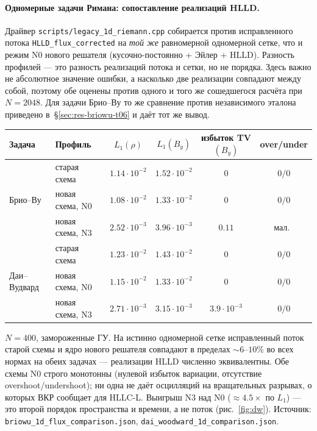 \documentclass[12pt,a4paper]{article}
\newcommand{\code}[1]{\texttt{#1}}
\begin{document}
\paragraph{Одномерные задачи Римана: сопоставление реализаций HLLD.}
Драйвер \code{scripts/legacy\_1d\_riemann.cpp} собирается против исправленного
потока \code{HLLD\_flux\_corrected} на \emph{той же} равномерной одномерной
сетке, что и режим N0 нового решателя (кусочно-постоянно + Эйлер + HLLD).
Разность профилей --- это разность реализаций потока и сетки, но не порядка.
Здесь важно не абсолютное значение ошибки, а насколько две реализации совпадают
между собой, поэтому обе оценены против одного и того же сошедшегося расчёта при
$N=2048$. Для задачи Брио--Ву то же сравнение против независимого эталона
приведено в~\S\ref{sec:res-briowu-t06} и даёт тот же вывод.

\begin{center}\footnotesize\setlength{\tabcolsep}{4.5pt}
\begin{tabular}{llcccc}
\toprule
Задача & Профиль & $L_1(\rho)$ & $L_1(B_y)$ & избыток TV$(B_y)$ & over/under \\
\midrule
\multirow{3}{*}{Брио--Ву}
 & старая схема & $1.14\!\cdot\!10^{-2}$ & $1.52\!\cdot\!10^{-2}$ & $0$ & $0/0$ \\
 & новая схема, N0 & $1.08\!\cdot\!10^{-2}$ & $1.33\!\cdot\!10^{-2}$ & $0$ & $0/0$ \\
 & новая схема, N3 & $2.52\!\cdot\!10^{-3}$ & $3.96\!\cdot\!10^{-3}$ & $0.11$ & мал.\ \\
\midrule
\multirow{3}{*}{Даи--Вудвард}
 & старая схема & $1.23\!\cdot\!10^{-2}$ & $1.43\!\cdot\!10^{-2}$ & $0$ & $0/0$ \\
 & новая схема, N0 & $1.15\!\cdot\!10^{-2}$ & $1.33\!\cdot\!10^{-2}$ & $0$ & $0/0$ \\
 & новая схема, N3 & $2.71\!\cdot\!10^{-3}$ & $3.15\!\cdot\!10^{-3}$ & $3.9\!\cdot\!10^{-3}$ & $0/0$ \\
\bottomrule
\end{tabular}
\end{center}
\noindent\footnotesize $N=400$, замороженные ГУ. На истинно одномерной сетке
исправленный поток старой схемы и ядро нового решателя
совпадают в пределах $\sim6\text{--}10\%$ во всех нормах на обеих задачах ---
реализации HLLD численно эквивалентны. Обе схемы N0 строго монотонны (нулевой
избыток вариации, отсутствие overshoot/undershoot); ни одна не даёт
осцилляций на вращательных разрывах, о которых ВКР сообщает для HLLC-L.
Выигрыш N3 над N0 ($\approx4.5\times$ по $L_1$) --- это второй порядок
пространства и времени, а не поток (рис.~\ref{fig:dw}). Источник:
\code{briowu\_1d\_flux\_comparison.json},
\code{dai\_woodward\_1d\_comparison.json}.\normalsize
\end{document}
